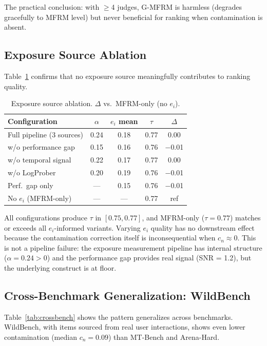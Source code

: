\documentclass[11pt]{article}
\begin{document}
The practical conclusion: with $\geq$4 judges, G-MFRM is harmless (degrades gracefully to MFRM level) but never beneficial for ranking when contamination is absent.

\subsection{Exposure Source Ablation}
\label{sec:ablation}

Table~\ref{tab:ablation} confirms that no exposure source meaningfully contributes to ranking quality.

\begin{table}[t]
\centering
\small
\caption{Exposure source ablation. $\Delta$ vs.\ MFRM-only (no $e_i$).}
\label{tab:ablation}
\begin{tabular}{lcccc}
\toprule
\textbf{Configuration} & $\alpha$ & $e_i$ mean & $\tau$ & $\Delta$ \\
\midrule
Full pipeline (3 sources) & 0.24 & 0.18 & 0.77 & 0.00 \\
w/o performance gap & 0.15 & 0.16 & 0.76 & $-$0.01 \\
w/o temporal signal & 0.22 & 0.17 & 0.77 & 0.00 \\
w/o LogProber & 0.20 & 0.19 & 0.76 & $-$0.01 \\
Perf.\ gap only & --- & 0.15 & 0.76 & $-$0.01 \\
No $e_i$ (MFRM-only) & --- & --- & 0.77 & ref \\
\bottomrule
\end{tabular}
\end{table}

All configurations produce $\tau$ in $[0.75, 0.77]$, and MFRM-only ($\tau = 0.77$) matches or exceeds all $e_i$-informed variants.
Varying $e_i$ quality has no downstream effect because the contamination correction itself is inconsequential when $c_n \approx 0$.
This is not a pipeline failure: the exposure measurement pipeline has internal structure ($\alpha = 0.24 > 0$) and the performance gap provides real signal (SNR = 1.2), but the underlying construct is at floor.

\subsection{Cross-Benchmark Generalization: WildBench}
\label{sec:wildbench}

Table~\ref{tab:crossbench} shows the pattern generalizes across benchmarks.
WildBench, with items sourced from real user interactions, shows even lower contamination (median $c_n = 0.09$) than MT-Bench and Arena-Hard.
\end{document}
